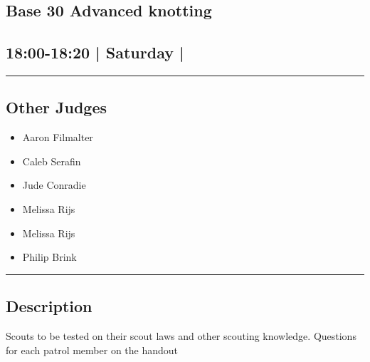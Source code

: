 \documentclass[10pt, A5]{article}
\begin{document}
	

		\begin{framed}
			\begin{minipage}{\textwidth}

			\setcounter{section}{65}
							\section{\faStar \: Base 30 \faStar \: Advanced knotting}
						
			\subsection*{18:00-18:20 | Saturday | }

			\vspace{0.25cm}
			\hrule
			\vspace{0.25cm}


			\subsection*{Other Judges}
							

				\begin{multicols}{2}

			\begin{itemize}
											\item Aaron Filmalter
											\item Caleb Serafin
											\item Jude Conradie
											\item Melissa Rijs
								\end{itemize}

			\vfill\null
			\columnbreak

			\begin{itemize}
											\item Melissa Rijs
											\item Philip Brink
								\end{itemize}

			\vfill\null

			\end{multicols}

			\vspace{0.25cm}
			\hrule
			\vspace{0.25cm}

			\begin{minipage}{\textwidth}
			\subsection*{\faListAlt \: Description}
			Scouts to be tested on their scout laws and other scouting knowledge. Questions for each patrol member on the handout
			\end{minipage}


	\end{minipage}
	\end{framed}
\end{document}
